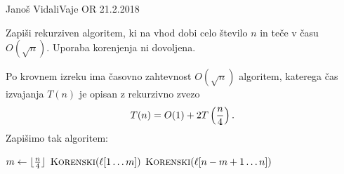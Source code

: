 \begin{naloga}{Janoš Vidali}{Vaje OR 21.2.2018}
\begin{vprasanje}[korenski]
Zapiši rekurziven algoritem,
ki na vhod dobi celo število $n$ in teče v času $O(\sqrt{n})$.
Uporaba korenjenja ni dovoljena.
\end{vprasanje}

\begin{odgovor}
Po krovnem izreku ima časovno zahtevnost $O(\sqrt{n})$ algoritem,
katerega čas izvajanja $T(n)$ je opisan z rekurzivno zvezo
$$
T(n) = O(1) + 2T\left({n \over 4}\right) .
$$
Zapišimo tak algoritem:
\begin{small}
\begin{algorithmic}
        \State $m \gets \lfloor {n \over 4} \rfloor$
        \State $\text{\sc Korenski}(\ell[1 \dots m])$
        \State $\text{\sc Korenski}(\ell[n-m+1 \dots n])$
    \EndIf
\EndFunction
\end{algorithmic}
\end{small}
\end{odgovor}
\end{naloga}


